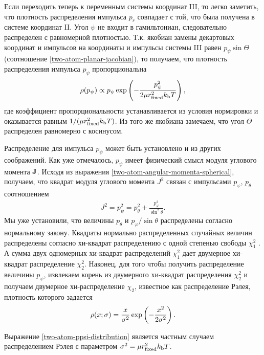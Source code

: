 Если переходить теперь к переменным системы координат III, то легко заметить, что плотность распределения импульса $p_r$ совпадает с той, что была получена в системе координат II. Угол $\psi$ не входит в гамильтониан, следовательно распределен с равномерной плотностью. Т.к. якобиан замены декартовых координат и импульсов на координаты и импульсы системы III равен $p_\psi \sin \Theta$ (соотношение \eqref{two-atom-planar-jacobian}), то получаем, что плотность распределения импульса $p_\psi$ пропорциональна
\begin{gather}
    \rho(p_\psi) \propto p_\psi \exp \left( -\frac{p_\psi^2}{2 \mu r_\text{fixed}^2 k_\text{b} T} \right), \label{two-atom-ppsi-distribution}
\end{gather}
где коэффициент пропорциональности устанавливается из условия нормировки и оказывается равным $1/(\mu r_\text{fixed}^2 k_\text{b} T)$. Из того же якобиана замечаем, что угол $\Theta$ распределен равномерно с косинусом. \par
Распределение для импульса $p_\psi$ может быть установлено и из других соображений. Как уже отмечалось, $p_\psi$ имеет физический смысл модуля углового момента $\mathbf{J}$. Исходя из выражения \eqref{two-atom-angular-momenta-spherical}, получаем, что квадрат модуля углового момента $J^2$ связан с импульсами $p_\varphi$, $p_\theta$ соотношением
\begin{gather}
    J^2 = p_\psi^2 = p_\theta^2 + \frac{p_\varphi^2}{\sin^2 \theta}. \label{two-atom-angular-momenta-connection} 
\end{gather}
Мы уже установили, что величины $p_\theta$ и $p_\varphi / \sin \theta$ распределены согласно нормальному закону. Квадраты нормально распределенных случайных величин распределены согласно хи-квадрат распределению с одной степенью свободы $\chi_1^2$ \cite{castaneda}. А сумма двух одномерных хи-квадрат распределений $\chi_1^2$ дает двумерное хи-квадрат распределение $\chi_2^2$. Наконец, для того чтобы получить распределение величины $p_\psi$, извлекаем корень из двумерного хи-квадрат распределения $\chi_2^2$ и получаем двумерное хи-распределение $\chi_2$, известное как распределение Рэлея, плотность которого задается  
\begin{gather}
    \rho(x; \sigma) = \frac{x}{\sigma^2} \exp \left( -\frac{x^2}{2 \sigma^2} \right). \label{rayleigh-density}
\end{gather}

Выражение \eqref{two-atom-ppsi-distribution} является частным случаем распределением Рэлея с параметром $\sigma^2 = \mu r_\text{fixed}^2 k_\text{b} T$.

